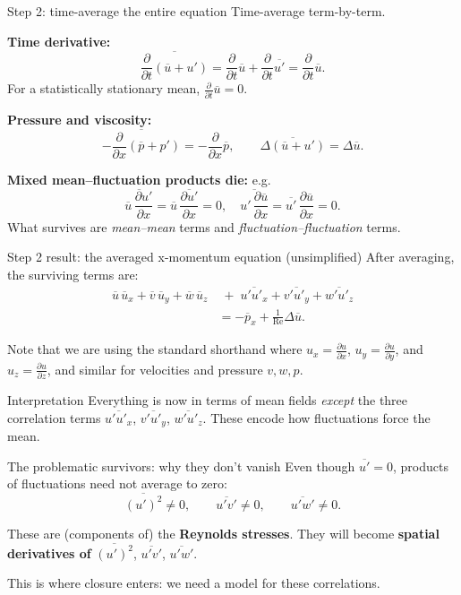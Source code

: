 \documentclass[aspectratio=169]{beamer}
\newcommand{\Rey}{\mathrm{Re}}
\newcommand{\avg}[1]{\overline{#1}}
\newcommand{\Lap}{\Delta}
\begin{document}
\begin{frame}{Step 2: time-average the entire equation}
Time-average term-by-term.

\textbf{Time derivative:}
\[
\avg{\frac{\partial}{\partial t}(\avg{u}+u')}
=
\frac{\partial}{\partial t} \avg{u} + \frac{\partial}{\partial t}\avg{u'}
=
\frac{\partial}{\partial t} \avg{u}.
\]
For a statistically stationary mean, $\frac{\partial}{\partial t}\avg{u}=0$.

\textbf{Pressure and viscosity:}
\[
\avg{-\frac{\partial}{\partial x}(\avg{p}+p')}=-\frac{\partial}{\partial x}\avg{p},\qquad
\avg{\Lap(\avg{u}+u')}=\Lap\avg{u}.
\]

\textbf{Mixed mean--fluctuation products die:} e.g.
\[
\avg{\avg{u}\,\frac{\partial u'}{\partial x}}=\avg{u}\,\avg{\frac{\partial u'}{\partial x}}=0,\quad
\avg{u'\,\frac{\partial \avg{u}}{\partial x}}=\avg{u'}\,\frac{\partial \avg{u}}{\partial x}=0.
\]
What survives are \emph{mean--mean} terms and \emph{fluctuation--fluctuation} terms.
\end{frame}

\begin{frame}{Step 2 result: the averaged x-momentum equation (unsimplified)}
After averaging, the surviving terms are:
\begin{align*}
\avg{u}\,\avg{u}_x
+\avg{v}\,\avg{u}_y
+\avg{w}\,\avg{u}_z
&\;+\;\avg{u' u'_x}
+\avg{v' u'_y}
+\avg{w' u'_z} \\
&= -\avg{p}_x + \frac{1}{\Rey}\Lap \avg{u}.
\end{align*}

Note that we are using the standard shorthand where $u_x = \frac{\partial u}{\partial x}$, $u_y = \frac{\partial u}{\partial y}$, and $u_z = \frac{\partial u}{\partial z}$, and similar for velocities and pressure $v,w,p$.

\begin{block}{Interpretation}
Everything is now in terms of mean fields \emph{except} the three correlation terms
$\avg{u' u'_x}$, $\avg{v' u'_y}$, $\avg{w' u'_z}$.
These encode how fluctuations force the mean.
\end{block}
\end{frame}

\begin{frame}{The problematic survivors: why they don't vanish}
Even though $\avg{u'}=0$, products of fluctuations need not average to zero:
\[
\avg{(u')^2}\neq 0,\qquad \avg{u'v'}\neq 0,\qquad \avg{u'w'}\neq 0.
\]

These are (components of) the \textbf{Reynolds stresses}.
They will become \textbf{spatial derivatives of} $\avg{(u')^2}$, $\avg{u'v'}$, $\avg{u'w'}$.

This is where closure enters: we need a model for these correlations.
\end{frame}
\end{document}
